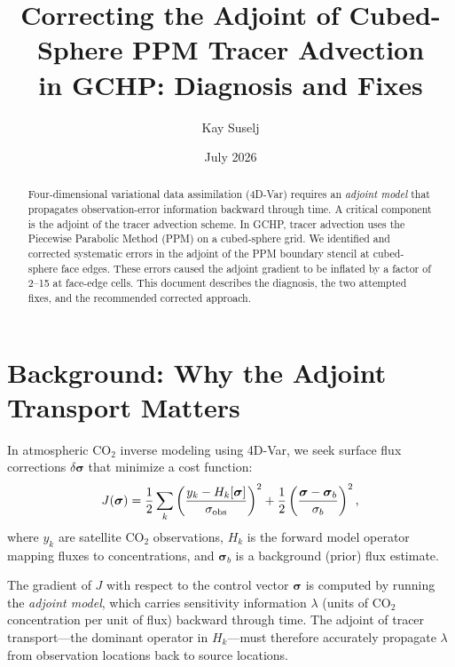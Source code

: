 \documentclass[11pt]{article}
\title{Correcting the Adjoint of Cubed-Sphere PPM Tracer Advection\\
in GCHP: Diagnosis and Fixes}
\author{Kay Suselj}
\date{July 2026}
\begin{document}
\maketitle

\begin{abstract}
Four-dimensional variational data assimilation (4D-Var) requires an
\emph{adjoint model} that propagates observation-error information backward
through time. A critical component is the adjoint of the tracer advection
scheme. In GCHP, tracer advection uses the Piecewise Parabolic Method (PPM)
on a cubed-sphere grid. We identified and corrected systematic errors in the
adjoint of the PPM boundary stencil at cubed-sphere face edges. These errors
caused the adjoint gradient to be inflated by a factor of 2--15 at face-edge
cells. This document describes the diagnosis, the two attempted fixes, and
the recommended corrected approach.
\end{abstract}

\tableofcontents
\newpage

\section{Background: Why the Adjoint Transport Matters}

In atmospheric CO$_2$ inverse modeling using 4D-Var, we seek surface flux
corrections $\delta\boldsymbol{\sigma}$ that minimize a cost function:
\begin{equation}
  J(\boldsymbol{\sigma}) = \frac{1}{2}
    \sum_{k}\left(\frac{y_k - H_k[\boldsymbol{\sigma}]}{\sigma_{\rm obs}}\right)^2
  + \frac{1}{2}\left(\frac{\boldsymbol{\sigma} - \boldsymbol{\sigma}_b}{\sigma_b}\right)^2,
  \label{eq:cost}
\end{equation}
where $y_k$ are satellite CO$_2$ observations, $H_k$ is the forward model
operator mapping fluxes to concentrations, and $\boldsymbol{\sigma}_b$ is a
background (prior) flux estimate.

The gradient of $J$ with respect to the control vector $\boldsymbol{\sigma}$
is computed by running the \emph{adjoint model}, which carries sensitivity
information $\lambda$ (units of CO$_2$ concentration per unit of flux)
backward through time. The adjoint of tracer transport---the dominant
operator in $H_k$---must therefore accurately propagate $\lambda$ from
observation locations back to source locations.
\end{document}
